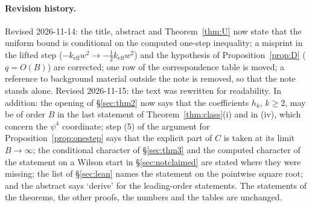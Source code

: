 \documentclass[11pt,a4paper]{article}
\theoremstyle{definition}
\theoremstyle{remark}
\begin{document}
\fussy
\paragraph{Revision history.} Revised 2026-11-14: the title, abstract and Theorem~\ref{thm:U} now state that the uniform bound is conditional on the computed one-step inequality; a misprint in the lifted step ($-k_{\mathrm{eff}}w^2\to-\tfrac12k_{\mathrm{eff}}w^2$) and the hypothesis of Proposition~\ref{prop:D} ($q=O(B)$) are corrected; one row of the correspondence table is moved; a reference to background material outside the note is removed, so that the note stands alone. Revised 2026-11-15: the text was rewritten for readability. In addition: the opening of \S\ref{sec:thm2} now says that the coefficients $h_k$, $k\ge2$, may be of order $B$ in the last statement of Theorem~\ref{thm:class}(i) and in (iv), which concern the $\psi^4$ coordinate; step (5) of the argument for Proposition~\ref{prop:onestep} says that the explicit part of $C$ is taken at its limit $B\to\infty$; the conditional character of \S\ref{sec:thm3} and the computed character of the statement on a Wilson start in \S\ref{sec:notclaimed} are stated where they were missing; the list of \S\ref{sec:lean} names the statement on the pointwise square root; and the abstract says `derive' for the leading-order statements. The statements of the theorems, the other proofs, the numbers and the tables are unchanged.
\end{document}
